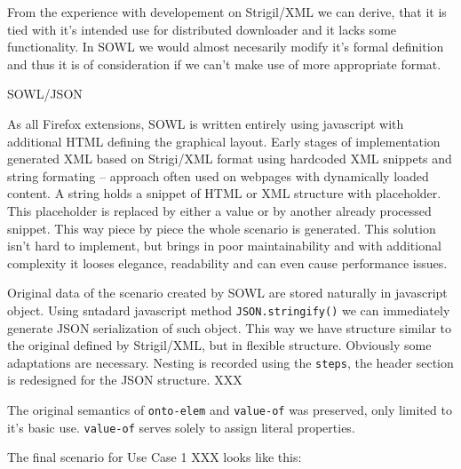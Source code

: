 From the experience with developement on Strigil/XML we can derive, that it is
tied with it's intended use for distributed downloader and it lacks some
functionality. In SOWL we would almost necesarily modify it's formal definition
and thus it is of consideration if we can't make use of more appropriate
format. 


\secc SOWL/JSON

As all Firefox extensions, SOWL is written entirely using javascript with
additional HTML defining the graphical layout. Early stages of implementation
generated XML based on Strigi/XML format using hardcoded XML snippets and
string formating -- approach often used on webpages with dynamically loaded
content. A string holds a snippet of HTML or XML structure with placeholder.
This placeholder is replaced by either a value or by another already processed
snippet. This way piece by piece the whole scenario is generated. This solution
isn't hard to implement, but brings in poor maintainability and with additional
complexity it looses elegance, readability and can even cause performance
issues. 

Original data of the scenario created by SOWL are stored naturally in
javascript object. Using sntadard javascript method {\tt JSON.stringify()} we
can immediately generate JSON serialization of such object. This way we have
structure similar to the original defined by Strigil/XML, but in flexible
structure. Obviously some adaptations are necessary. Nesting is recorded using
the {\tt steps}, the header section is redesigned for the JSON structure. XXX

The original semantics of {\tt onto-elem} and {\tt value-of} was preserved,
only limited to it's basic use. {\tt value-of} serves solely to assign literal
properties. 

The final scenario for Use Case 1 XXX looks like this: 

